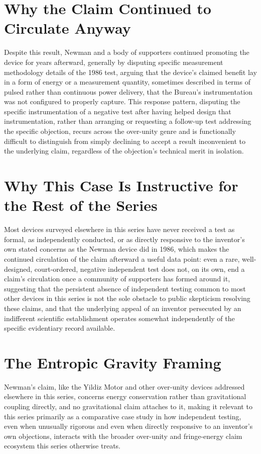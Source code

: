 \documentclass[11pt]{article}
\begin{document}
\section{Why the Claim Continued to Circulate Anyway}

Despite this result, Newman and a body of supporters continued promoting the device for years afterward, generally by disputing specific measurement methodology details of the 1986 test, arguing that the device's claimed benefit lay in a form of energy or a measurement quantity, sometimes described in terms of pulsed rather than continuous power delivery, that the Bureau's instrumentation was not configured to properly capture. This response pattern, disputing the specific instrumentation of a negative test after having helped design that instrumentation, rather than arranging or requesting a follow-up test addressing the specific objection, recurs across the over-unity genre and is functionally difficult to distinguish from simply declining to accept a result inconvenient to the underlying claim, regardless of the objection's technical merit in isolation.

\section{Why This Case Is Instructive for the Rest of the Series}

Most devices surveyed elsewhere in this series have never received a test as formal, as independently conducted, or as directly responsive to the inventor's own stated concerns as the Newman device did in 1986, which makes the continued circulation of the claim afterward a useful data point: even a rare, well-designed, court-ordered, negative independent test does not, on its own, end a claim's circulation once a community of supporters has formed around it, suggesting that the persistent absence of independent testing common to most other devices in this series is not the sole obstacle to public skepticism resolving these claims, and that the underlying appeal of an inventor persecuted by an indifferent scientific establishment operates somewhat independently of the specific evidentiary record available.

\section{The Entropic Gravity Framing}

Newman's claim, like the Yildiz Motor and other over-unity devices addressed elsewhere in this series, concerns energy conservation rather than gravitational coupling directly, and no gravitational claim attaches to it, making it relevant to this series primarily as a comparative case study in how independent testing, even when unusually rigorous and even when directly responsive to an inventor's own objections, interacts with the broader over-unity and fringe-energy claim ecosystem this series otherwise treats.
\end{document}
